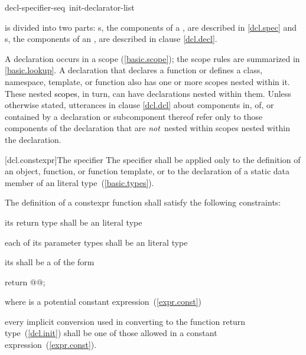 \documentclass[american]{book}
\begin{document}
\begin{paras}
\begin{ncsimplebnf}
decl-specifier-seq\opt\ init-declarator-list\opt\ \terminal{;}
\end{ncsimplebnf}

\textcolor{black}{}is divided into two parts:
s,
the components of a
,
are described in \ref{dcl.spec} and
s,
the components of an
,
are described in clause \ref{dcl.decl}.

\pnum
A declaration occurs in a scope (\ref{basic.scope});
the scope rules are summarized in \ref{basic.lookup}.
A declaration that declares a function or defines a class,
 namespace, template, 
or function also has one or more scopes nested within it.
These nested \textcolor{black}{scopes}, in
turn, can have declarations nested within them.
Unless otherwise stated,
utterances in clause \ref{dcl.dcl} about components in, of, or contained by a
declaration or subcomponent thereof refer only to those components of the
declaration that are
\textit{not}\ 
nested within scopes nested within the declaration.


\setcounter{section}{1}
\setcounter{subsection}{4}

[dcl.constexpr]{The  specifier}
\pnum
The  specifier shall be applied only to the definition of
an object, function, or function template, or to the declaration of a static
data member of an
literal type~(\ref{basic.types}). 

\setcounter{Paras}{2}
\pnum
The definition of a constexpr function shall satisfy the following
constraints:

\begin{itemize}
\item{its return type shall be an
 literal type}
\item{each of its parameter types shall be an
\addedCC{effective}
literal type}
\item{its  shall be a
 of the form
\begin{codeblock}
{ return @@; }
\end{codeblock}
where  is a potential constant
expression~(\ref{expr.const})
\item{every implicit conversion used in converting
 to the function return type~(\ref{dcl.init})
shall be one of those allowed in a constant
expression~(\ref{expr.const}).}
}
\end{itemize}




\end{paras}
\end{document}
